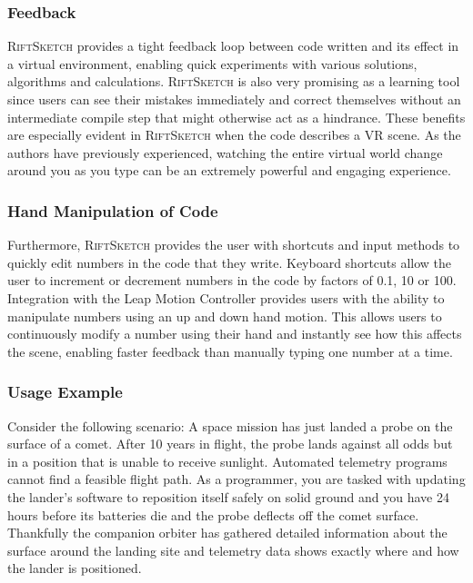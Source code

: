 \documentclass[conference]{IEEEtran}
\begin{document}
\subsubsection{Feedback}

\textsc{RiftSketch} provides a tight feedback loop between code written and its effect in a virtual environment, enabling quick experiments with various solutions, algorithms and calculations. 
\textsc{RiftSketch} is also very promising as a learning tool since users can see their mistakes immediately and correct themselves without an intermediate compile step that might otherwise act as a hindrance.  
These benefits are especially evident in \textsc{RiftSketch} when the code describes a VR scene. 
As the authors have previously experienced, watching the entire virtual world change around you as you type can be an extremely powerful and engaging experience.

\subsubsection{Hand Manipulation of Code}

Furthermore, \textsc{RiftSketch} provides the user with shortcuts and input methods to quickly edit numbers in the code that they write. 
Keyboard shortcuts allow the user to increment or decrement numbers in the code by factors of 0.1, 10 or 100. 
Integration with the Leap Motion Controller provides users with the ability to manipulate numbers using an up and down hand motion.
This allows users to continuously modify a number using their hand and instantly see how this affects the scene, enabling faster feedback than manually typing one number at a time.




\subsubsection{Usage Example}
Consider the following scenario: A space mission has just landed a probe on the surface of a comet.
After 10 years in flight, the probe lands against all odds but in a position that is unable to receive sunlight.
Automated telemetry programs cannot find a feasible flight path.
As a programmer, you are tasked with updating the lander's software to reposition itself safely on solid ground and you have 24 hours before its batteries die and the probe deflects off the comet surface. 
Thankfully the companion orbiter has gathered detailed information about the surface around the landing site and telemetry data shows exactly where and how the lander is positioned.
\end{document}
